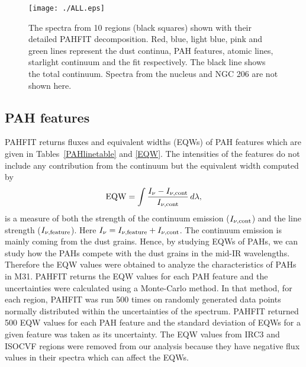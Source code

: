\begin{figure}
\centering
\texttt{[image: ./ALL.eps]}
  \caption{The spectra from 10 regions (black squares) shown with their detailed PAHFIT decomposition. Red, blue, light blue, pink and green lines represent the dust continua, PAH features, atomic lines, starlight continuum and the fit respectively. The black line shows the total continuum. Spectra from the nucleus and NGC 206 are not shown here.}
\label{PAHFITplots}
\end{figure}


\subsection{PAH features}
\label{sect:pah}

PAHFIT returns fluxes and equivalent widths (EQWs) of PAH features which are given in Tables~\ref{PAHlinetable} and \ref{EQW}. The intensities of the features do not include any contribution from the continuum but the equivalent width computed by
\begin{equation}
{\rm EQW}=\int \frac{I_{\nu} - I_{\nu, {\rm cont}}}{I_{\nu, {\rm cont}}} \,d\lambda,
\end{equation}
is a measure of both the strength of the continuum emission ($I_{\nu, {\rm cont}} $) and the line strength ($I_{\nu,{\rm feature}}$). 
Here $I_{\nu} =I_{\nu,{\rm feature}}+ I_{\nu, {\rm cont}} $. 
The continuum emission is mainly coming from the dust grains. Hence, by studying EQWs of PAHs, we can study how the PAHs compete with the dust grains in the mid-IR wavelengths. Therefore the EQW values were obtained to analyze the characteristics of PAHs in M31. PAHFIT returns the EQW values for each PAH feature and the uncertainties were calculated using a Monte-Carlo method. In that method, for each region, PAHFIT was run 500 times on randomly generated data points  normally distributed within the uncertainties of the spectrum. PAHFIT returned 500 EQW values for each PAH feature and the standard deviation of EQWs for a given feature was taken as its uncertainty. 
The EQW values from IRC3 and ISOCVF regions were removed from our analysis because they have negative flux values in their spectra which can affect the EQWs. 


